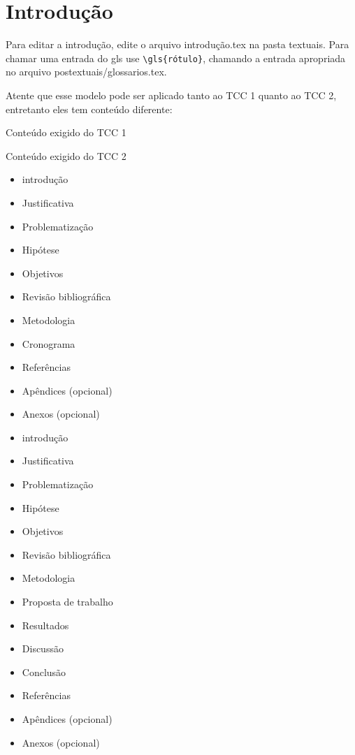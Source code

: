 \chapter{Introdução}
Para editar a introdução, edite o arquivo introdução.tex na pasta textuais. Para chamar uma entrada do \gls{gls} use \verb+\gls{rótulo}+, chamando a entrada apropriada no arquivo postextuais/glossarios.tex.

Atente que esse modelo pode ser aplicado tanto ao TCC 1 quanto ao TCC 2, entretanto eles tem conteúdo diferente: 

\begin{minipage}{0.5\textwidth}
Conteúdo exigido do TCC 1
\end{minipage}
\begin{minipage}{0.5\textwidth}
Conteúdo exigido do TCC 2
\end{minipage}
\begin{minipage}{0.5\textwidth}

	\vspace{-15mm}
	\begin{itemize}
		\item introdução
		\item Justificativa
		\item Problematização
		\item Hipótese
		\item Objetivos
		\item Revisão bibliográfica
		\item Metodologia 
		\item Cronograma
		\item Referências
		\item Apêndices (opcional)
		\item Anexos (opcional)				
	\end{itemize}
\end{minipage}
\begin{minipage}{0.5\textwidth}
	\vspace{1cm}
	\begin{itemize}
		\item introdução
		\item Justificativa
		\item Problematização
		\item Hipótese
		\item Objetivos
		\item Revisão bibliográfica
		\item Metodologia 
		\item Proposta de trabalho
		\item Resultados
		\item Discussão
		\item Conclusão
		\item Referências
		\item Apêndices (opcional)
		\item Anexos (opcional)
	\end{itemize}
\end{minipage}

